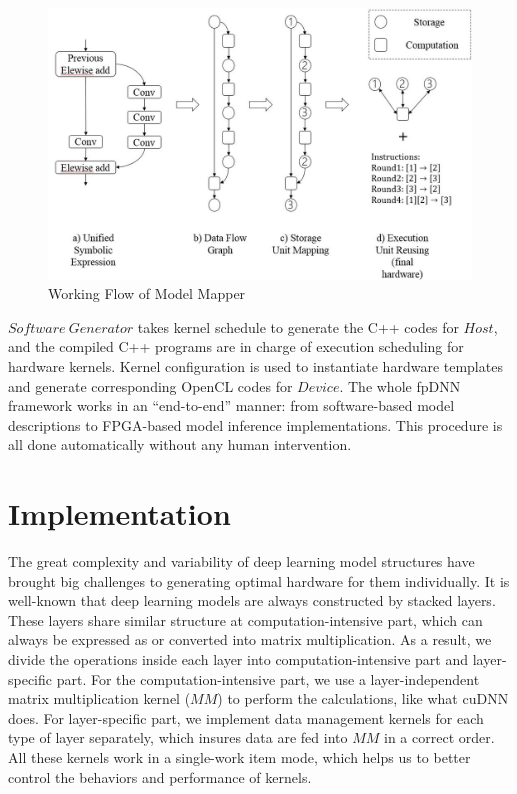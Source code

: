 \documentclass{acm_proc_article-sp-copy}
\begin{document}
\begin{figure}
	\centering
	\includegraphics[width=1.0\linewidth]{./figure/sc.jpg}
	\caption{Working Flow of Model Mapper}
	\label{sc}
\end{figure}

$Software\ Generator$ takes kernel schedule to generate the C++ codes for $Host$, and the compiled C++ programs are in charge of execution scheduling for hardware kernels. Kernel configuration is used to instantiate hardware templates and generate corresponding OpenCL codes for $Device$. The whole fpDNN framework works in an ``end-to-end'' manner: from software-based model descriptions to FPGA-based model inference implementations. This procedure is all done automatically without any human intervention.

\section{Implementation}
The great complexity and variability of deep learning model structures have brought big challenges to generating optimal hardware for them individually. It is well-known that deep learning models are always constructed by stacked layers. These layers share similar structure at computation-intensive part, which can always be expressed as or converted into matrix multiplication. As a result, we divide the operations inside each layer into computation-intensive part and layer-specific part. For the computation-intensive part, we use a layer-independent matrix multiplication kernel ($MM$) to perform the calculations, like what cuDNN does. For layer-specific part, we implement data management kernels for each type of layer separately, which insures data are fed into $MM$ in a correct order. All these kernels work in a single-work item mode, which helps us to better control the behaviors and performance of kernels.
\end{document}
